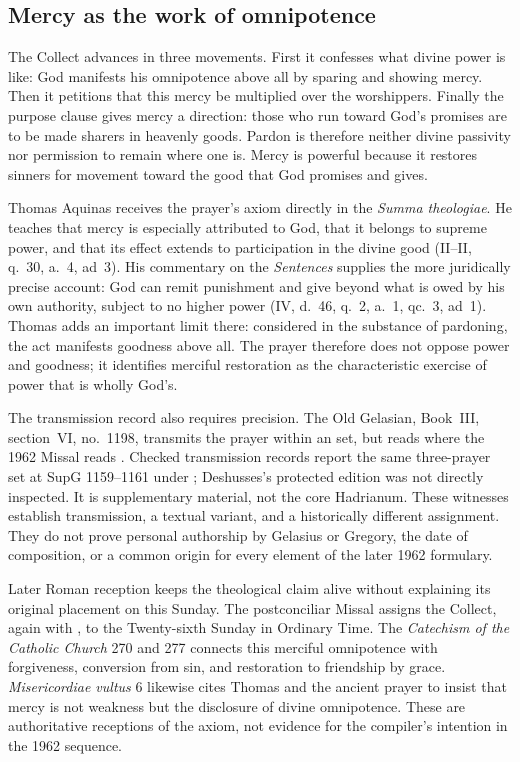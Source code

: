 \subsection*{Mercy as the work of omnipotence\enspace{}}

The Collect advances in three movements. First it confesses what divine power
is like: God manifests his omnipotence above all by sparing and showing mercy.
Then it petitions that this mercy be multiplied over the worshippers. Finally
the purpose clause gives mercy a direction: those who run toward God's
promises are to be made sharers in heavenly goods. Pardon is therefore neither
divine passivity nor permission to remain where one is. Mercy is powerful
because it restores sinners for movement toward the good that God promises
and gives.

Thomas Aquinas receives the prayer's axiom directly in the
\emph{Summa theologiae}. He teaches that mercy is especially attributed to
God, that it belongs to supreme power, and that its effect extends to
participation in the divine good (II--II, q.~30, a.~4, ad~3). His commentary
on the \emph{Sentences} supplies the more juridically precise account:
God can remit punishment and give beyond what is owed by his own authority,
subject to no higher power (IV, d.~46, q.~2, a.~1, qc.~3, ad~1). Thomas adds
an important limit there: considered in the substance of pardoning, the act
manifests goodness above all. The prayer therefore does not oppose power and
goodness; it identifies merciful restoration as the characteristic exercise
of power that is wholly God's.

The transmission record also requires precision. The Old Gelasian,
Book~III, section~VI, no.~1198, transmits the prayer within an
 set, but reads  where the 1962 Missal
reads . Checked transmission records report the same
three-prayer set at SupG 1159--1161 under
; Deshusses's protected edition
was not directly inspected. It is supplementary material,
not the core Hadrianum. These witnesses establish transmission, a textual
variant, and a historically different assignment. They do not prove personal
authorship by Gelasius or Gregory, the date of composition, or a common origin
for every element of the later 1962 formulary.

Later Roman reception keeps the theological claim alive without explaining
its original placement on this Sunday. The postconciliar Missal assigns the
Collect, again with , to the Twenty-sixth Sunday in Ordinary
Time. The \emph{Catechism of the Catholic Church} 270 and 277 connects this
merciful omnipotence with forgiveness, conversion from sin, and restoration
to friendship by grace. \emph{Misericordiae vultus} 6 likewise cites Thomas
and the ancient prayer to insist that mercy is not weakness but the disclosure
of divine omnipotence. These are authoritative receptions of the axiom, not
evidence for the compiler's intention in the 1962 sequence.

